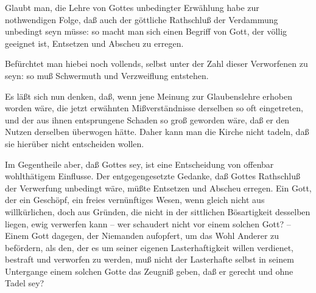 \begin{aufza}
\begin{RWanm}
\begin{aufzb}
\item Glaubt man, die Lehre von Gottes unbedingter Erwählung habe zur nothwendigen Folge, daß auch der göttliche Rathschluß der Verdammung unbedingt seyn müsse: so macht man sich einen Begriff von Gott, der völlig geeignet ist, Entsetzen und Abscheu zu erregen.
\item Befürchtet man hiebei noch vollends, selbst unter der Zahl dieser Verworfenen zu seyn: so muß Schwermuth und Verzweiflung entstehen.~
\end{aufzb}\par
Es läßt sich nun denken, daß, wenn jene Meinung zur Glaubenslehre erhoben worden wäre, die jetzt erwähnten Mißverständnisse derselben so oft eingetreten, und der aus ihnen entsprungene Schaden so groß geworden wäre, daß er den Nutzen derselben überwogen hätte. Daher kann man die Kirche nicht tadeln, daß sie hierüber nicht entscheiden wollen. 
\end{RWanm}
\item Im Gegentheile aber, daß Gottes  sey, ist eine Entscheidung von offenbar wohlthätigem Einflusse. Der entgegengesetzte Gedanke, daß Gottes Rathschluß der Verwerfung unbedingt wäre, müßte Entsetzen und Abscheu erregen. Ein Gott, der ein Geschöpf, ein freies vernünftiges Wesen, wenn gleich nicht aus willkürlichen, doch aus Gründen, die nicht in der sittlichen Bösartigkeit desselben liegen, ewig verwerfen kann -- wer schaudert nicht vor einem solchen Gott? -- Einem Gott dagegen, der Niemanden aufopfert, um das Wohl Anderer zu befördern, als den, der es um seiner eigenen Lasterhaftigkeit willen verdienet, bestraft und verworfen zu werden, muß nicht der Lasterhafte selbst in seinem Untergange einem solchen Gotte das Zeugniß geben, daß er gerecht und ohne Tadel sey?
\end{aufza}

